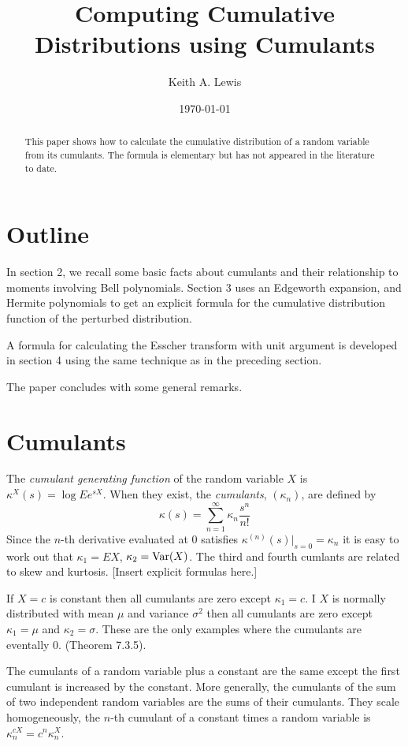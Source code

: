 \documentclass[fleqn]{amsart}
\title{Computing Cumulative Distributions using Cumulants}
\author{Keith A. Lewis}
\date{\today}
\newcommand{\Var}{\mathop{\rm{Var}}}
\theoremstyle{definition}
\begin{document}
\maketitle
\begin{abstract}
This paper shows how to calculate the cumulative distribution
of a random variable from its cumulants. The formula is
elementary but has not appeared in the literature to date.
\end{abstract}

\section{Outline}

In section 2, we recall some basic facts about cumulants and their
relationship to moments involving Bell polynomials.  Section 3 uses an
Edgeworth expansion, and Hermite polynomials to get an explicit formula
for the cumulative distribution function of the perturbed distribution.

A formula for calculating the Esscher transform with unit argument is
developed in section 4 using the same technique as in the preceding
section.

The paper concludes with some general remarks.

\section{Cumulants}

The {\em cumulant generating function} of the random variable \(X\)
is \(\kappa^X(s) = \log Ee^{sX}\).
When they exist, the {\em cumulants}, \((\kappa_n)\),
are defined by
\[
\kappa(s) = \sum_{n=1}^\infty \kappa_n \frac{s^n}{n!}
\]
Since the \(n\)-th derivative evaluated at \(0\)
satisfies \(\kappa^{(n)}(s)|_{s = 0} = \kappa_n\) 
it is easy to
work out that
\(\kappa_1 = EX\), \(\kappa_2 = \Var(X)\). The third and fourth 
cumlants are related to skew and kurtosis. [Insert explicit formulas here.]

If \(X = c\) is constant then all cumulants are zero except \(\kappa_1 = c\).
I \(X\) is normally distributed with mean \(\mu\) and variance \(\sigma^2\)
then all cumulants are zero except \(\kappa_1 = \mu\) and
\(\kappa_2 = \sigma\). These are the only examples where the
cumulants are eventally 0. \cite{Luk1970} (Theorem 7.3.5).

The cumulants of a random variable plus a constant are the 
same except the first cumulant is increased by the constant.
More generally, the cumulants of the sum of two independent 
random variables are the sums of their cumulants.
They scale homogeneously, the \(n\)-th cumulant of a constant
times a random variable is
\(\kappa^{cX}_n = c^n\kappa^X_n\).
\end{document}
